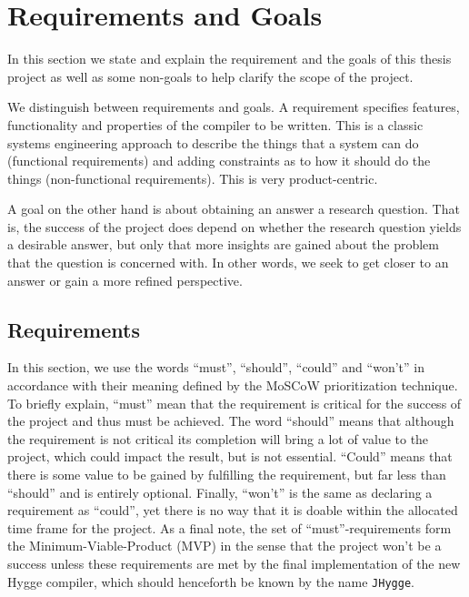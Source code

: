\chapter{Requirements and Goals} \label{sec:requirements}

In this section we state and explain the requirement and the goals of this thesis project as well as some non-goals to help clarify the scope
of the project.

We distinguish between requirements and goals. A requirement specifies features, functionality and properties of the compiler to be written.
This is a classic systems engineering approach to describe the things that a system can do (functional requirements) and adding constraints as
to how it should do the things (non-functional requirements). This is very product-centric.

A goal on the other hand is about obtaining an answer a research question. That is, the success of the project does depend on whether the research
question yields a desirable answer, but only that more insights are gained about the problem that the question is concerned with. In other words,
we seek to get closer to an answer or gain a more refined perspective.

\section{Requirements}

In this section, we use the words ``must'', ``should'', ``could'' and ``won't'' in accordance with their meaning defined by the MoSCoW prioritization
technique. To briefly explain, ``must'' mean that the requirement is critical for the success of the project and thus must be achieved. The
word ``should'' means that although the requirement is not critical its completion will bring a lot of value to the project, which could impact
the result, but is not essential. ``Could'' means that there is some value to be gained by fulfilling the requirement, but far less than ``should''
and is entirely optional.
Finally, ``won't'' is the same as declaring a requirement as ``could'', yet there is no way that it is doable within the allocated time frame for the project.
As a final note, the set of ``must''-requirements form the Minimum-Viable-Product (MVP) in the sense that the project won't be a success unless these
requirements are met by the final implementation of the new Hygge compiler, which should henceforth be known by the name \texttt{JHygge}.

